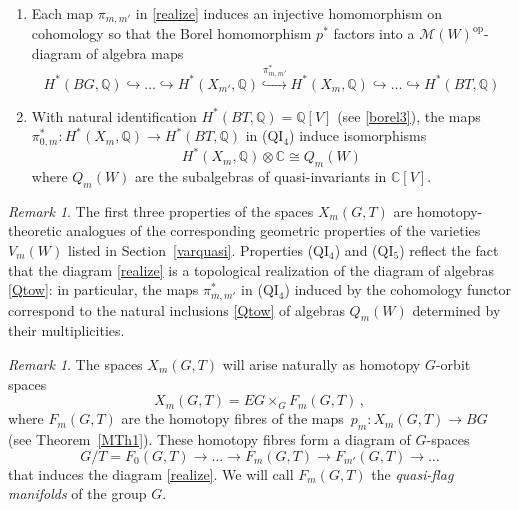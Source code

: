 \documentclass[11pt]{amsart}
\theoremstyle{definition}
\theoremstyle{remark}
\newtheorem{remark}[theorem]{Remark}
\numberwithin{equation}{section}
\newcommand{\la}{\label}
\newcommand{\red}{\textcolor{red}}
\def\c{\mathbb{C}}
\def\M{\mathcal{M}}
\def\Q{\mathbb{Q}}
\begin{document}
\begin{enumerate}
\vspace{1ex}

\item[(QI$_{4}$)] Each map $\pi_{m,m'}$ in \eqref{realize} induces an injective homomorphism on cohomology so that the Borel homomorphism $p^\ast$ factors into a $\M(W)^{\mathrm{op}}$-diagram of algebra maps 
%
\begin{equation*} 
\la{factorborel} 
{H}^{\ast}(BG,\Q) \hookrightarrow \ldots \hookrightarrow {H}^{\ast}(X_{m'}, \Q) \stackrel{\pi_{m,m'}^{\ast}}{\hookrightarrow} {H}^{\ast}(X_m,\Q) \hookrightarrow \ldots \hookrightarrow {H}^\ast(BT,\Q) 
\end{equation*}
%

\vspace{1ex}

\item[(QI$_{5}$)]
With natural identification $ H^*(BT,\Q) = \Q[V] $ (see \eqref{borel3}), the maps $\pi_{0,m}^{\ast}: H^{\ast}(X_m, \Q) \to H^*(BT, \Q) $ in (QI$_{4}$) induce isomorphisms
%
\begin{equation*} \la{cohqi} 
H^{\ast}(X_m, \Q) \otimes \c \cong Q_m(W)
\end{equation*}
%
where $Q_m(W)$ are the subalgebras of quasi-invariants in $\c[V]$.
\end{enumerate}


%
%
\begin{remark} 
The first three properties of the spaces $X_m(G,T) $ are homotopy-theoretic analogues of the corresponding geometric properties of the varieties  $V_m(W)$ listed in Section~\ref{varquasi}. Properties (QI$_{4}$) and (QI$_{5}$) reflect the fact that the diagram \eqref{realize} is a topological realization of the diagram of algebras \eqref{Qtow}: in particular, the maps $\pi_{m,m'}^* $ in  (QI$_{4}$) induced by the cohomology functor correspond to the natural inclusions \eqref{Qtow} of algebras $Q_m(W)$ determined by their multiplicities.
\end{remark}
%

\begin{remark}
The spaces $X_m(G,T)$ will arise naturally as homotopy $G$-orbit spaces 
$$ 
X_m(G,T) = EG \times_G F_m(G,T)\,,
$$ 
where $ F_m(G,T) $ are the homotopy fibres of the maps $\,p_m: X_m(G,T) \to BG \,$ (see  Theorem~\ref{MTh1}).
These homotopy fibres form a diagram of $G$-spaces 
$$ 
G/T = F_0(G,T) \to \ldots \to F_m(G,T) \to F_{m'}(G,T) \to \ldots  
$$  
that induces the diagram \eqref{realize}. We will call $ F_m(G,T) $ the {\it quasi-flag manifolds} of the group $G$.
\end{remark}
\end{document}
